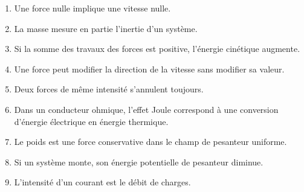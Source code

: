 \documentclass[11pt,a4paper]{article}
\begin{document}
\begin{enumerate}[label=\textbf{VF \arabic*.},leftmargin=*]
\item Une force nulle implique une vitesse nulle.
\item La masse mesure en partie l'inertie d'un système.
\item Si la somme des travaux des forces est positive, l'énergie cinétique augmente.
\item Une force peut modifier la direction de la vitesse sans modifier sa valeur.
\item Deux forces de même intensité s'annulent toujours.
\item Dans un conducteur ohmique, l'effet Joule correspond à une conversion d'énergie électrique en énergie thermique.
\item Le poids est une force conservative dans le champ de pesanteur uniforme.
\item Si un système monte, son énergie potentielle de pesanteur diminue.
\item L'intensité d'un courant est le débit de charges.
\end{enumerate}
\end{document}
